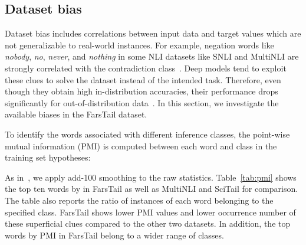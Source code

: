 \documentclass[preprint,12pt]{elsarticle}
\begin{document}
\subsection{Dataset bias}\label{subsec:bias}
Dataset bias includes correlations between input data and target values which are not generalizable to real-world instances. For example, negation words like \textit{nobody}, \textit{no}, \textit{never}, and \textit{nothing} in some NLI datasets like SNLI and MultiNLI are strongly correlated with the contradiction class~\citep{gururangan2018annotation}. Deep models tend to exploit these clues to solve the dataset instead of the intended task. Therefore, even though they obtain high in-distribution accuracies, their performance drops significantly for out-of-distribution data~\citep{mccoy2020right}. In this section, we investigate the available biases in the FarsTail dataset. 

To identify the words associated with different inference classes, the point-wise mutual information (PMI) is computed between each word and class in the training set hypotheses:


As in~\citep{gururangan2018annotation,bowman2020new}, we apply add-100 smoothing to the raw statistics. Table~\ref{tab:pmi} shows the top ten words by  in FarsTail as well as MultiNLI and SciTail for comparison. The table also reports the ratio of instances of each word belonging to the specified class. FarsTail shows lower PMI values and lower occurrence number of these superficial clues compared to the other two datasets. In addition, the top words by PMI in FarsTail belong to a wider range of classes. 
\end{document}
